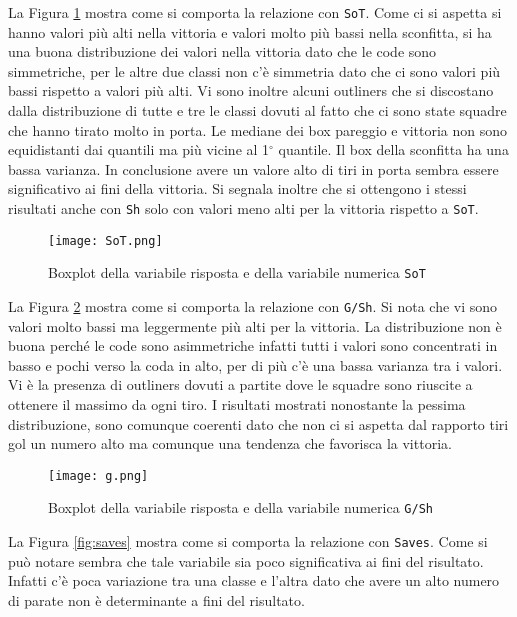 La Figura \ref{fig:sot} mostra come si comporta la relazione con \texttt{SoT}. Come ci si aspetta si hanno valori più alti nella vittoria e valori molto più bassi nella sconfitta, si ha una buona distribuzione dei valori nella vittoria dato che le code sono simmetriche, per le altre due classi non c'è simmetria dato che ci sono valori più bassi rispetto a valori più alti. Vi sono inoltre alcuni outliners che si discostano dalla distribuzione di tutte e tre le classi dovuti al fatto che ci sono state squadre che hanno tirato molto in porta. Le mediane dei box pareggio e vittoria non sono equidistanti dai quantili ma più vicine al 1$^{\circ}$ quantile. Il box della sconfitta ha una bassa varianza. In conclusione avere un valore alto di tiri in porta sembra essere significativo ai fini della vittoria. Si segnala inoltre che si ottengono i stessi risultati anche con \texttt{Sh} solo con valori meno alti per la vittoria rispetto a \texttt{SoT}.\\

\begin{figure}[htbp]
	\begin{center}
		\texttt{[image: SoT.png]}
		\caption{Boxplot della variabile risposta e della variabile numerica \texttt{SoT} } \label{fig:sot}
	\end{center}
\end{figure}

La Figura \ref{fig:g} mostra come si comporta la relazione con \texttt{G/Sh}. Si nota che vi sono valori molto bassi ma leggermente più alti per la vittoria. La distribuzione non è buona perché le code sono asimmetriche infatti tutti i valori sono concentrati in basso e pochi verso la coda in alto, per di più c'è una bassa varianza tra i valori. Vi è la presenza di outliners dovuti a partite dove le squadre sono riuscite a ottenere il massimo da ogni tiro. I risultati mostrati nonostante la pessima distribuzione, sono comunque coerenti dato che non ci si aspetta dal rapporto tiri gol un numero alto ma comunque una tendenza che favorisca la vittoria.\\

\begin{figure}[htbp]
	\begin{center}
		\texttt{[image: g.png]}
		\caption{Boxplot della variabile risposta e della variabile numerica \texttt{G/Sh} } \label{fig:g}
	\end{center}
\end{figure}

La Figura \ref{fig:saves} mostra come si comporta la relazione con \texttt{Saves}. Come si può notare sembra che tale variabile sia poco significativa ai fini del risultato. Infatti c'è poca variazione tra una classe e l'altra dato che avere un alto numero di parate non è determinante a fini del risultato.\\

